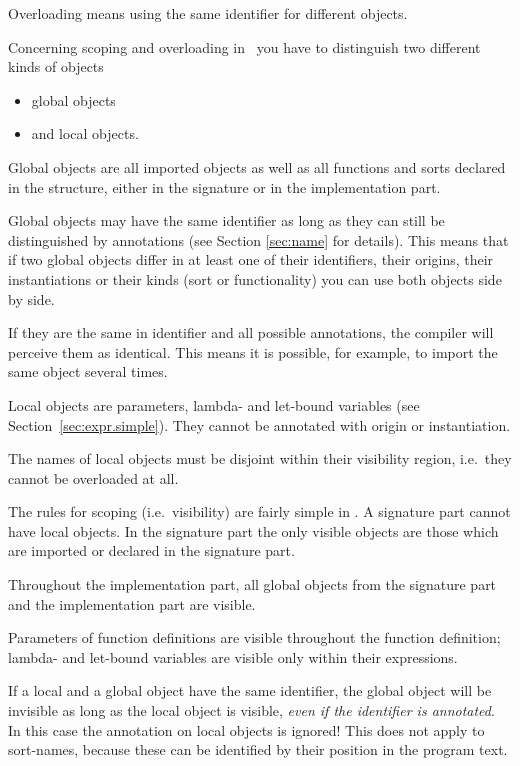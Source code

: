 Overloading means using the same identifier for different objects.

Concerning scoping and overloading in \opal\ you have to  distinguish
two different kinds of objects
\begin{itemize}
\item global objects
\item and local objects.
\end{itemize}
Global objects are all imported objects as well as all functions and sorts
declared in the structure, either in the signature or in the
implementation part. 

Global objects may have the same identifier as long as they can still be
distinguished by annotations (see Section \ref{sec:name} for details).
This means that if two global objects differ in at least one of their
identifiers, their origins, their instantiations  or their kinds (sort or
functionality) you can use both objects side by side.

If they are the same in identifier and all possible annotations, the
compiler will perceive them as identical.
This means it is possible, for example, to import the same object several times.

Local objects are parameters, lambda- and let-bound variables (see
Section~\ref{sec:expr.simple}).
They cannot be annotated with origin or instantiation.

\important The names of local objects must be disjoint within their visibility
region, i.e.~they cannot be overloaded at all.

\medskip
\novice The rules for scoping (i.e.~visibility) are fairly simple in \opal.
A signature part cannot have local objects.
In the signature part the only  visible objects are those which are 
imported or declared in the signature part.
\medskip

Throughout  the implementation part, all global objects from the signature part
and the implementation part are visible.

\medskip
Parameters of function definitions are visible throughout the function
definition; lambda- and let-bound variables are visible only within
their expressions. 

\important If a local and a
global object have the same identifier, the global object will be invisible
as long as the local object is visible, {\em even if the identifier is
  annotated\/}. In this case the annotation on local objects is ignored!
This does not apply to sort-names, because these can be identified by their
position in the program text.

